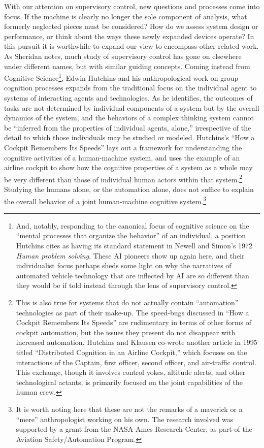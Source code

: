With our attention on supervisory control, new questions and processes
come into focus. If the machine is clearly no
longer the sole component of analysis, what formerly neglected pieces
must be considered? How do we assess system design or performance, or
think about the ways these newly expanded devices operate? In this
pursuit it is worthwhile to expand our
view to encompass other related work. As Sheridan notes, much study of
supervisory control has gone on elsewhere under different names, but
with similar guiding concepts. Coming instead from Cognitive
Science\footnote{And, notably, responding to the canonical focus of
  cognitive science on the ``mental processes that organize the
  behavior'' of an individual, a position Hutchins cites as having its
standard statement in Newell and Simon's 1972 \emph{Human problem
  solving}.\cite[p. 265-266]{hutchinsCockpit} These AI pioneers show
up again here, and their individualist focus perhaps sheds some 
light on why the narratives of automated vehicle technology that are
inflected by AI are so different than they would be if told instead
through the lens of supervisory control.},
Edwin Hutchins and his anthropological work on group cognition
processes expands from the traditional focus on the individual agent
to systems of interacting agents and technologies. As he identifies,
the outcomes of tasks are not determined by individual components of a
system but by the overall dynamics of the system, and the behaviors of
a complex thinking system cannot be ``inferred from the properties of
individual agents, alone,'' irrespective of the detail to which those
individuals may be studied or modeled.\cite[p. 265]{hutchinsCockpit}
Hutchins's ``How a Cockpit Remembers Its Speeds'' lays out a framework
for understanding the cognitive activities of a human-machine system,
and uses the example of an airline cockpit to show how the cognitive
properties of a system as a whole may be very different than those of
individual human actors within that system.\footnote{This is also true
for systems that do not actually contain ``automation'' technologies
as part of their make-up. The speed-bugs discussed in ``How a Cockpit
Remembers Its Speeds'' are rudimentary in terms of other forms of
cockpit automation, but the issues they present do not disappear with
increased automation. Hutchins and Klausen co-wrote another
article in 1995 titled ``Distributed Cognition in an Airline
Cockpit,''\cite{???-hutchinsKlausen} which focuses on the interactions of the Captain, first
officer, second officer, and air-traffic control. This exchange,
though it involves control yokes, altitude alerts, and other
technological actants, is primarily focused on the joint capabilities
of the human crew.} Studying the humans alone,
or the automation alone, does not suffice to explain the overall
behavior of a joint human-machine cognitive system.\footnote{It is
  worth noting here that these are not the remarks of a maverick or a
  ``mere'' anthropologist working on his own. The research involved
  was supported by a grant from the NASA Ames Research Center, as part
  of the Aviation Safety/Automation Program.}

